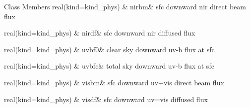 \begin{DoxyFields}{Class Members}
real(kind=kind\+\_\+phys)\hypertarget{namespacemodule__radsw__parameters_aae8070f9f477bf036071ccc7d707693d}{}\label{namespacemodule__radsw__parameters_aae8070f9f477bf036071ccc7d707693d}
&
nirbm&
sfc downward nir direct beam flux \\
\hline

real(kind=kind\+\_\+phys)\hypertarget{namespacemodule__radsw__parameters_a9944f87ce40eb678e3ca1d88b1dbb797}{}\label{namespacemodule__radsw__parameters_a9944f87ce40eb678e3ca1d88b1dbb797}
&
nirdf&
sfc downward nir diffused flux \\
\hline

real(kind=kind\+\_\+phys)\hypertarget{namespacemodule__radsw__parameters_a9e9e74c17ad3aa0a1c280f1eae513b22}{}\label{namespacemodule__radsw__parameters_a9e9e74c17ad3aa0a1c280f1eae513b22}
&
uvbf0&
clear sky downward uv-\/b flux at sfc \\
\hline

real(kind=kind\+\_\+phys)\hypertarget{namespacemodule__radsw__parameters_a7b0ac40e0ceb2ce82b6b95a614542b4f}{}\label{namespacemodule__radsw__parameters_a7b0ac40e0ceb2ce82b6b95a614542b4f}
&
uvbfc&
total sky downward uv-\/b flux at sfc \\
\hline

real(kind=kind\+\_\+phys)\hypertarget{namespacemodule__radsw__parameters_aabfae10580f53c63900c74261b1b219c}{}\label{namespacemodule__radsw__parameters_aabfae10580f53c63900c74261b1b219c}
&
visbm&
sfc downward uv+vis direct beam flux \\
\hline

real(kind=kind\+\_\+phys)\hypertarget{namespacemodule__radsw__parameters_a3eb91eab30abc0f1f1bb05c5447cede5}{}\label{namespacemodule__radsw__parameters_a3eb91eab30abc0f1f1bb05c5447cede5}
&
visdf&
sfc downward uv=vis diffused flux \\
\hline

\end{DoxyFields}
